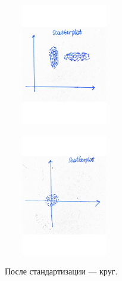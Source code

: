 \documentclass[specialist, 12pt,
subf, %
href, colorlinks=true,
substylefile = spbu.rtx,
]{disser}
\begin{document}
\begin{enumerate}
	\begin{minipage}{0.51\linewidth}
			\centering
		\includegraphics[width=150pt, height=150pt]{p03}
	\end{minipage}
	\begin{minipage}{0.51\linewidth}
			\centering
		\includegraphics[width=150pt, height=150pt]{p04}
	\end{minipage}
После стандартизации --- круг.
\end{enumerate}
\end{document}
